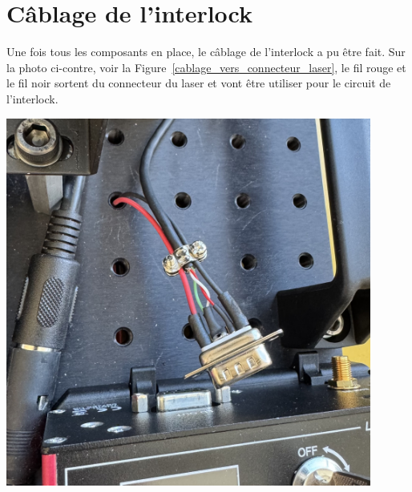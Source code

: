 \section{Câblage de l'interlock}
\begin{minipage}[c]{0.48\textwidth}
    Une fois tous les composants en place, le câblage de l'interlock a pu être fait. Sur la photo ci-contre, voir la Figure~\ref{cablage_vers_connecteur_laser}, le fil rouge et le fil noir sortent du connecteur du laser et vont être utiliser pour le circuit de l'interlock.
\end{minipage}\hfill
\begin{minipage}[c]{0.48\textwidth}
    \begin{center}
        \includegraphics[width=0.9\textwidth]{assets/figures/Protections_laser/Securite_electrique/cablage_vers_connecteur_laser.jpeg}
    \end{center}
    \label{cablage_vers_connecteur_laser}
\end{minipage}


